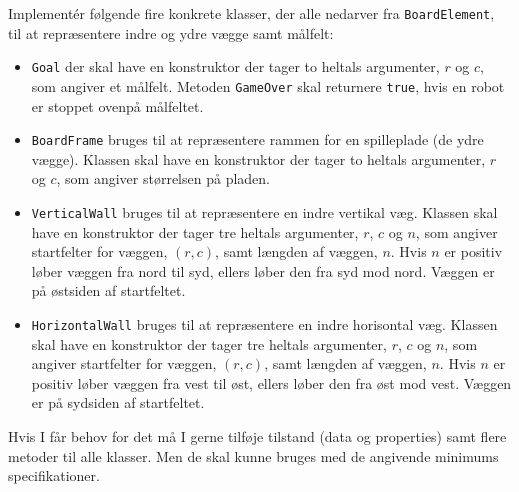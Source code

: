 Implementér følgende fire konkrete klasser, der alle nedarver fra
\lstinline{BoardElement}, til at repræsentere indre og ydre vægge samt målfelt:

\begin{itemize}
\item \lstinline{Goal} der skal have en konstruktor der tager to
  heltals argumenter, $r$ og $c$, som angiver et målfelt. Metoden
  \lstinline{GameOver} skal returnere \lstinline{true}, hvis en robot
  er stoppet ovenpå målfeltet.
\item \lstinline{BoardFrame} bruges til at repræsentere rammen for
  en spilleplade (de ydre vægge). Klassen skal have en konstruktor der tager to
  heltals argumenter, $r$ og $c$, som angiver størrelsen på pladen.
\item \lstinline{VerticalWall} bruges til at repræsentere en indre
  vertikal væg. Klassen skal have en konstruktor der tager tre
  heltals argumenter, $r$, $c$ og $n$, som angiver startfelter for
  væggen, $(r,c)$, samt længden af væggen, $n$. Hvis $n$ er positiv
  løber væggen fra nord til syd, ellers løber den fra syd mod
  nord. Væggen er på østsiden af startfeltet.
\item \lstinline{HorizontalWall} bruges til at repræsentere en indre
  horisontal væg. Klassen skal have en konstruktor der tager tre
  heltals argumenter, $r$, $c$ og $n$, som angiver startfelter for
  væggen, $(r,c)$, samt længden af væggen, $n$. Hvis $n$ er positiv
  løber væggen fra vest til øst, ellers løber den fra øst mod
  vest. Væggen er på sydsiden af startfeltet.
\end{itemize}

Hvis I får behov for det må I gerne tilføje tilstand (data og
properties) samt flere metoder til alle klasser. Men de skal kunne
bruges med de angivende minimums specifikationer.




